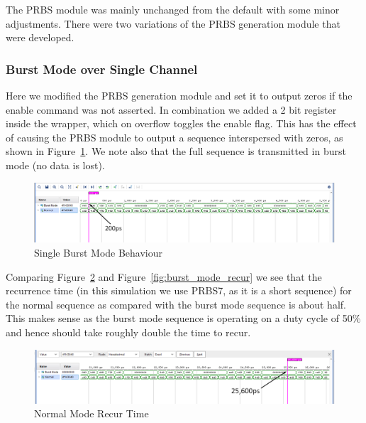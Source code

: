 The PRBS module was mainly unchanged from the default with some minor
adjustments.  There were two variations of the PRBS generation module that were
developed.

\subsubsection{Burst Mode over Single Channel}%
\label{ssub:burst_mode_over_single_channel}
Here we modified the PRBS generation module and set it to output zeros if the
enable command was not asserted.  In combination we added a 2 bit register
inside the wrapper, which on overflow toggles the enable flag. This has the
effect of causing the PRBS module to output a sequence interspersed with zeros,
as shown in Figure~\ref{fig:burst_mode_start}. We note also that the full sequence
is transmitted in burst mode (no data is lost).

\begin{figure}[ht]
    \centering
    \hspace*{-3cm}\includegraphics[width=1.5\linewidth]{img/burst_mode_1.png}
    \caption{Single Burst Mode Behaviour}%
    \label{fig:burst_mode_start}
\end{figure}

Comparing Figure~\ref{fig:normal_mode_recur} and
Figure~\ref{fig:burst_mode_recur} we see that the recurrence time (in this simulation we use PRBS7, as
it is a short sequence) for the normal sequence as compared with the burst mode
sequence is about half. This makes sense as the burst mode sequence is
operating on a duty cycle of 50\% and hence should take roughly double the time
to recur.

\begin{figure}[ht]
    \centering
    \hspace*{-3cm}\includegraphics[width=1.5\linewidth]{img/burst_mode_2.png}
    \caption{Normal Mode Recur Time}%
    \label{fig:normal_mode_recur}
\end{figure}

